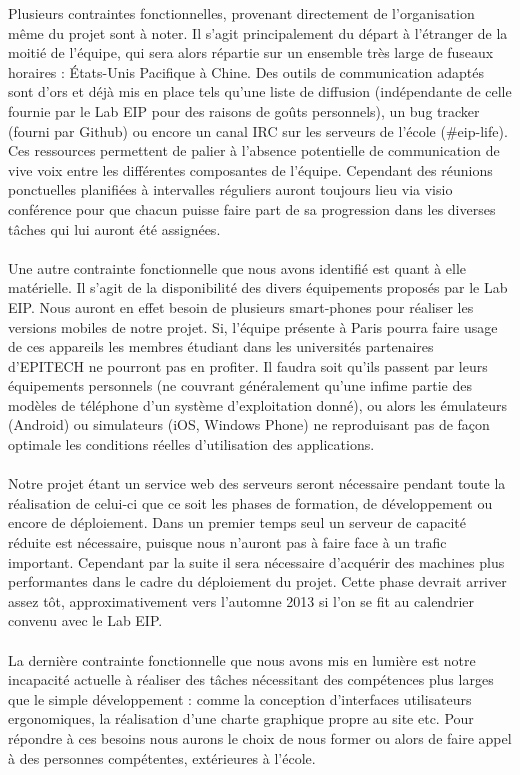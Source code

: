 \documentclass{life-fr}
\begin{document}
Plusieurs contraintes fonctionnelles, provenant directement de l'organisation même du projet sont à noter. Il s'agit principalement du départ à l'étranger de la moitié de l'équipe, qui sera alors répartie sur un ensemble très large de fuseaux horaires : États-Unis Pacifique à Chine. Des outils de communication adaptés sont d'ors et déjà mis en place tels qu'une liste de diffusion (indépendante de celle fournie par le Lab EIP pour des raisons de goûts personnels), un bug tracker (fourni par Github) ou encore un canal IRC sur les serveurs de l'école (\#eip-life). Ces ressources permettent de palier à l'absence potentielle de communication de vive voix entre les différentes composantes de l'équipe. Cependant des réunions ponctuelles planifiées à intervalles réguliers auront toujours lieu via visio conférence pour que chacun puisse faire part de sa progression dans les diverses tâches qui lui auront été assignées.\\
\\
Une autre contrainte fonctionnelle que nous avons identifié est quant à elle matérielle. Il s'agit de la disponibilité des divers équipements proposés par le Lab EIP. Nous auront en effet besoin de plusieurs smart-phones pour réaliser les versions mobiles de notre projet. Si, l'équipe présente à Paris pourra faire usage de ces appareils les membres étudiant dans les universités partenaires d'EPITECH ne pourront pas en profiter. Il faudra soit qu'ils passent par leurs équipements personnels (ne couvrant généralement qu'une infime partie des modèles de téléphone d'un système d'exploitation donné), ou alors les émulateurs (Android) ou simulateurs (iOS, Windows Phone) ne reproduisant pas de façon optimale les conditions réelles d'utilisation des applications.\\
\\
Notre projet étant un service web des serveurs seront nécessaire pendant toute la réalisation de celui-ci que ce soit les phases de formation, de développement ou encore de déploiement. Dans un premier temps seul un serveur de capacité réduite est nécessaire, puisque nous n'auront pas à faire face à un trafic important. Cependant par la suite il sera nécessaire d'acquérir des machines plus performantes dans le cadre du déploiement du projet. Cette phase devrait arriver assez tôt, approximativement vers l'automne 2013 si l'on se fit au calendrier convenu avec le Lab EIP.\\
\\
La dernière contrainte fonctionnelle que nous avons mis en lumière est notre incapacité actuelle à réaliser des tâches nécessitant des compétences plus larges que le simple développement : comme la conception d'interfaces utilisateurs ergonomiques, la réalisation d'une charte graphique propre au site etc. Pour répondre à ces besoins nous aurons le choix de nous former ou alors de faire appel à des personnes compétentes, extérieures à l'école.
\end{document}
